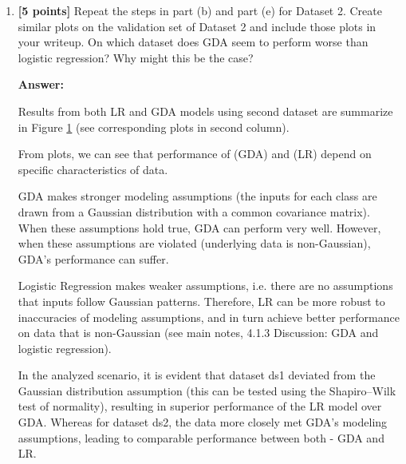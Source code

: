 \documentclass{article}
\begin{document}
\begin{enumerate}[label=\alph*)]
\textbf{Answer:}

Here we see that for ds1 -  GDA shows poorer performance when compared to LR, as  modelling assumptions made by GDA do not represent data characteristics (see corresponding plots given in first column of Figure \ref{fig:decision_boundary_GDA_all} ).
\begin{figure}[H]
  \centering
  \includegraphics[width=0.7\textwidth]
  {LR_GDA_results_all.png}
  \caption{Decision boundary plots corresponding to ds$\{1,2\}\_\{$valid$\}$ datasets using LR and GDA methods.}
  \label{fig:decision_boundary_GDA_all}
\end{figure}






\item \textbf{[5 points]} Repeat the steps in part (b) and part (e) for Dataset 2. Create similar plots on
the validation set of Dataset 2 and include those plots in your writeup.
On which dataset does GDA seem to perform worse than logistic regression? Why might
this be the case?

\textbf{Answer:}

Results from both LR and GDA models using second dataset are summarize in Figure \ref{fig:decision_boundary_GDA_all} (see corresponding plots in second column).

From plots, we can see that performance of (GDA) and (LR) depend on specific characteristics of data.

GDA makes stronger modeling assumptions (the inputs for each class are drawn from a Gaussian distribution with a common covariance matrix). When these assumptions hold true, GDA can perform very well. However, when these assumptions are violated (underlying data is non-Gaussian), GDA's performance can suffer.

Logistic Regression makes weaker assumptions, i.e. there are no assumptions that inputs follow Gaussian patterns. Therefore, LR can be more robust to inaccuracies of modeling assumptions, and in turn  achieve better performance on data that is non-Gaussian (see main notes, 4.1.3 Discussion: GDA and logistic regression).

In the analyzed scenario, it is evident that dataset ds1 deviated from the Gaussian distribution assumption (this can be tested using the Shapiro–Wilk test of normality), resulting in superior performance of the LR model over GDA. Whereas for dataset ds2, the data more closely met GDA's modeling assumptions, leading to comparable performance between both - GDA and LR.




\end{enumerate}
\end{document}
